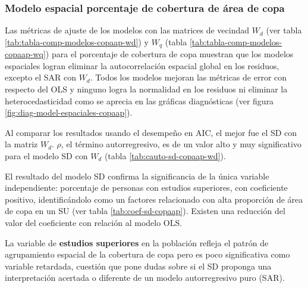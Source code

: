 \documentclass[12pt,a4paper,openany]{book}
\theoremstyle{definition}
\theoremstyle{definition}
\theoremstyle{definition}
\theoremstyle{remark}
\begin{document}
\subsubsection{Modelo espacial porcentaje de cobertura de área de
copa}\label{modelo-espacial-porcentaje-de-cobertura-de-uxe1rea-de-copa}

Las métricas de ajuste de los modelos con las matrices de vecindad
\(W_d\) (ver tabla \ref{tab:tabla-comp-modelos-copaap-wd}) y \(W_q\)
(tabla \ref{tab:tabla-comp-modelos-copaap-wq}) para el porcentaje de
cobertura de copa muestran que los modelos espaciales logran eliminar la
autocorrelación espacial global en los residuos, excepto el SAR con
\(W_d\). Todos los modelos mejoran las métricas de error con respecto
del OLS y ninguno logra la normalidad en los residuos ni eliminar la
heterocedasticidad como se aprecia en las gráficas diagnósticas (ver
figura \ref{fig:diag-model-espaciales-copaap}).

Al comparar los resultados usando el desempeño en AIC, el mejor fue el
SD con la matriz \(W_d\). \(\rho\), el término autorregresivo, es de un
valor alto y muy significativo para el modelo SD con \(W_d\) (tabla
\ref{tab:cauto-sd-copaap-wd}).

El resultado del modelo SD confirma la significancia de la única
variable independiente: porcentaje de personas con estudios superiores,
con coeficiente positivo, identificándolo como un factores relacionado
con alta proporción de área de copa en un SU (ver tabla
\ref{tab:coef-sd-copaap}). Existen una reducción del valor del
coeficiente con relación al modelo OLS.

La variable de \textbf{estudios superiores} en la población refleja el
patrón de agrupamiento espacial de la cobertura de copa pero es poco
significativa como variable retardada, cuestión que pone dudas sobre si
el SD proponga una interpretación acertada o diferente de un modelo
autorregresivo puro (SAR).
\end{document}
